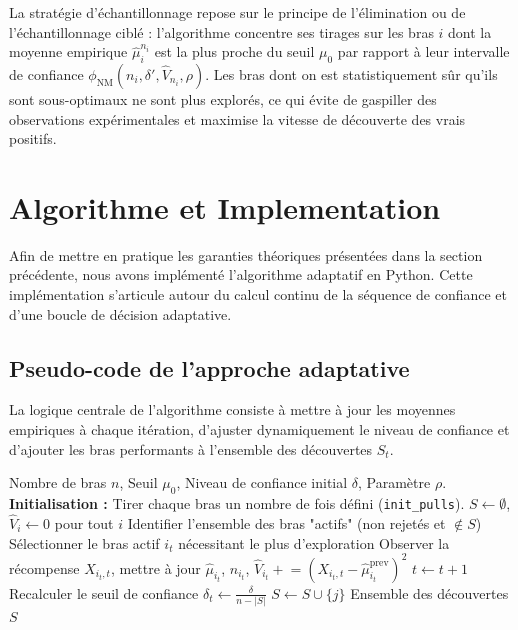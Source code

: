 \documentclass[11pt,a4paper]{article}
\newcommand{\muhat}{\hat{\mu}}
\newcommand{\phinm}{\phi_{\mathrm{NM}}}
\begin{document}
La stratégie d'échantillonnage repose sur le principe de l'élimination ou de l'échantillonnage ciblé : l'algorithme concentre ses tirages sur les bras $i$ dont la moyenne empirique $\muhat_i^{n_i}$ est la plus proche du seuil $\mu_0$ par rapport à leur intervalle de confiance $\phinm(n_i, \delta', \hat{V}_{n_i}, \rho)$. Les bras dont on est statistiquement sûr qu'ils sont sous-optimaux ne sont plus explorés, ce qui évite de gaspiller des observations expérimentales et maximise la vitesse de découverte des vrais positifs.

\section{Algorithme et Implementation}
\label{sec:algo}


Afin de mettre en pratique les garanties théoriques présentées dans la section précédente, nous avons implémenté l'algorithme adaptatif en Python. Cette implémentation s'articule autour du calcul continu de la séquence de confiance et d'une boucle de décision adaptative.

\subsection{Pseudo-code de l'approche adaptative}

La logique centrale de l'algorithme consiste à mettre à jour les moyennes empiriques à chaque itération, d'ajuster dynamiquement le niveau de confiance et d'ajouter les bras performants à l'ensemble des découvertes $S_t$.

\begin{algorithm}[H]
\caption{Algorithme Bandit Adaptatif (Inspiré de Jamieson \& Jain)}\label{alg:bandit_fdr}
\begin{algorithmic}[1]
\Require Nombre de bras $n$, Seuil $\mu_0$, Niveau de confiance initial $\delta$, Paramètre $\rho$.
\State \textbf{Initialisation :} Tirer chaque bras un nombre de fois défini (\texttt{init\_pulls}).
\State $S \gets \emptyset$, $\hat{V}_i \gets 0$ pour tout $i$ 
    \State Identifier l'ensemble des bras "actifs" (non rejetés et $\notin S$)
    \State Sélectionner le bras actif $i_t$ nécessitant le plus d'exploration
    \State Observer la récompense $X_{i_t,t}$, mettre à jour $\muhat_{i_t}$, $n_{i_t}$,
           $\hat{V}_{i_t} \mathrel{+}= (X_{i_t,t} - \muhat_{i_t}^{\mathrm{prev}})^2$
    \State $t \gets t + 1$
    \State Recalculer le seuil de confiance $\delta_t \gets \frac{\delta}{n - |S|}$
        \If{$\muhat_j^{n_j} - \phinm(n_j, \delta_t, \hat{V}_{n_j}, \rho) \geq \mu_0$}
            \State $S \gets S \cup \{j\}$
        \EndIf
    \EndFor
\EndWhile
\Ensure Ensemble des découvertes $S$
\end{algorithmic}
\end{algorithm}
\end{document}
